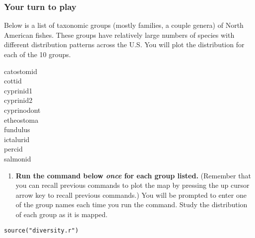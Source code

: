 \documentclass[11pt]{article}
\begin{document}
\subsubsection*{Your turn to play}

Below is a list of taxonomic groups (mostly families, a couple genera) of North American fishes.  These groups
have relatively large numbers of species with different distribution
patterns across the U.S. You will plot the distribution for each of the 10 groups.

\begin{multicols}{2}
catostomid \\
cottid \\
cyprinid1 \\
cyprinid2 \\
cyprinodont \\
etheostoma \\
fundulus \\
ictalurid \\
percid \\
salmonid
\end{multicols}

\begin{enumerate}[resume]
\item \textbf{Run the command below \emph{once} for each group listed.} (Remember that you can recall
previous commands to plot the map by pressing the up cursor
arrow key to recall previous commands.) You will be prompted to enter one of the group names each time you run the command. Study the distribution of each group as it is mapped.
\end{enumerate}

\begin{verbatim}
source("diversity.r")
\end{verbatim}
\end{document}

